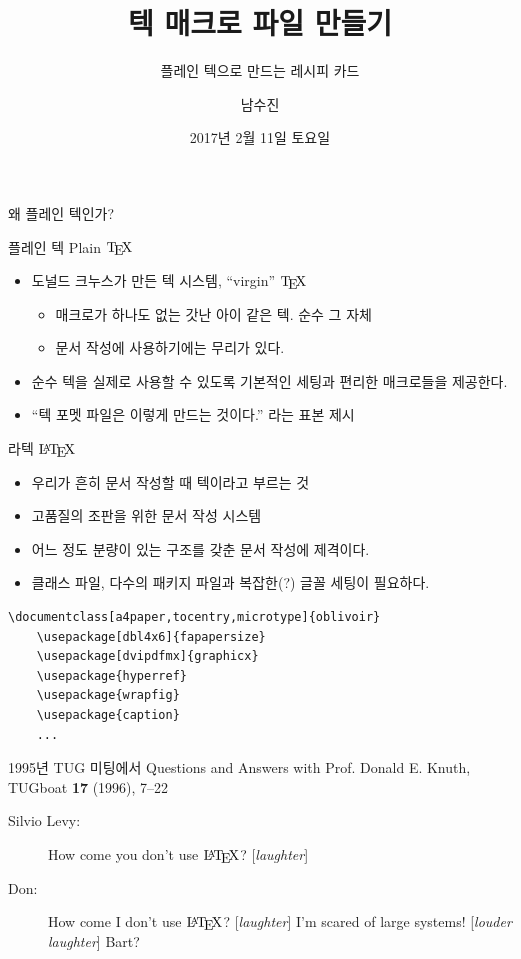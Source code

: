 \documentclass{beamer}
\title{텍 매크로 파일 만들기}
\subtitle{플레인 텍으로 만드는 레시피 카드}
\date{2017년 2월 11일 토요일}
\author{남수진}
\institute{
  2017 한국텍학회 학술대회 및 정기총회 \\
  동국대학교 법학관 B253호}
\def\TEX/{$\textrm{\TeX}$}
\def\LATEX/{$\textrm{\LaTeX}$}
\begin{document}
\maketitle

%
\begin{frame}[standout]
  왜 플레인 텍인가?
\end{frame}


%
\begin{frame}[fragile]{플레인 텍 Plain \TEX/}
  \begin{itemize}
  \item 도널드 크누스가 만든 텍 시스템, \alert{``virgin'' \TEX/}
    \begin{itemize}
    \item 매크로가 하나도 없는 갓난 아이 같은 텍. 순수 그 자체
    \item 문서 작성에 사용하기에는 무리가 있다.
    \end{itemize}
  \item 순수 텍을 실제로 사용할 수 있도록 기본적인 세팅과 편리한 매크로들을 제공한다.
  \item ``텍 포멧 파일은 이렇게 만드는 것이다.'' 라는 표본 제시
  \end{itemize}
\end{frame}


%
\begin{frame}[fragile]{라텍 \LATEX/}
  \begin{itemize}
  \item 우리가 흔히 문서 작성할 때 텍이라고 부르는 것
  \item 고품질의 조판을 위한 문서 작성 시스템
  \item 어느 정도 분량이 있는 구조를 갖춘 문서 작성에 제격이다.
  \item 클래스 파일, 다수의 패키지 파일과 복잡한(?) 글꼴 세팅이 필요하다.
  \end{itemize}
  
  \begin{Verbatim}[fontsize=\small]
    \documentclass[a4paper,tocentry,microtype]{oblivoir}
    \usepackage[dbl4x6]{fapapersize}
    \usepackage[dvipdfmx]{graphicx}
    \usepackage{hyperref}
    \usepackage{wrapfig}
    \usepackage{caption}
    ...
  \end{Verbatim}
\end{frame}


%
\begin{frame}{1995년 TUG 미팅에서}
  Questions and Answers with Prof. Donald E. Knuth, 
  TUGboat \textbf{17} (1996), 7--22
  \begin{description}
  \item[Silvio Levy:] How come you don't use \LATEX/? [\textsl{laughter}]
  \item[Don:] How come I don't use \LATEX/? [\textsl{laughter}]
    I'm scared of \alert{large systems!} [\textsl{louder laughter\/}]
    Bart?
  \end{description}
\end{frame}
\end{document}
